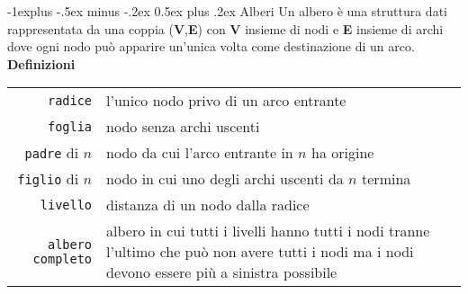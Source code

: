 \documentclass[10pt,landscape]{article}
\makeatletter
\renewcommand{\subsection}{\@startsection{subsection}{2}{0mm}%
                                {-1explus -.5ex minus -.2ex}%
                                {0.5ex plus .2ex}%
                                {\normalfont\large\bfseries}}
\makeatother
\begin{document}
\begin{multicols*}{4}
                \subsection{Alberi}
                Un albero è una struttura dati rappresentata da una coppia (\textbf{V},\textbf{E}) con \textbf{V} insieme di nodi e \textbf{E} insieme di archi dove ogni nodo può apparire un'unica volta come destinazione di un arco. \\ [3pt]
                \textbf{Definizioni} \\ [3pt]
                \begin{tabular}{rp{7cm}}
                        \verb|radice|          & l'unico nodo privo di un arco entrante                                                                                                           \\
                        \verb|foglia|          & nodo senza archi uscenti                                                                                                                         \\
                        \verb|padre| di $n$    & nodo da cui l'arco entrante in $n$ ha origine                                                                                                    \\
                        \verb|figlio| di $n$   & nodo in cui uno degli archi uscenti da $n$ termina                                                                                               \\
                        \verb|livello|         & distanza di un nodo dalla radice                                                                                                                 \\
                        \verb|albero completo| & albero in cui tutti i livelli hanno tutti i nodi tranne l'ultimo che può non avere tutti i nodi ma i nodi devono essere più a sinistra possibile \\
                \end{tabular}

\end{multicols*}
\end{document}

